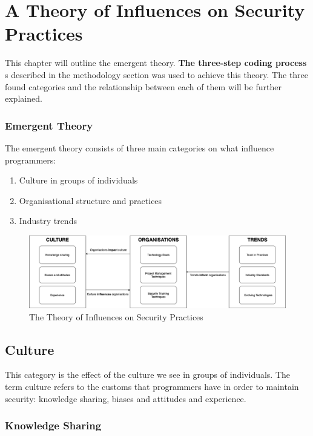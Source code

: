 \chapter{A Theory of Influences on Security Practices}\label{C:Emergent Theory}

This chapter will outline the emergent theory. \textbf{The three-step coding process }s described in the methodology section was used to achieve this theory. The three found categories and the relationship between each of them will be further explained.

\subsection{Emergent Theory}

The emergent theory consists of three main categories on what influence programmers:

\begin{enumerate}
\item  Culture in groups of individuals
\item Organisational structure and practices
\item Industry trends
\end{enumerate}

\begin{figure}[ht]
\includegraphics[width=17cm]{figures/fig2.png}
\centering
\caption{The Theory of Influences on Security Practices}
\centering
\end{figure}

\section{Culture}

This category is the effect of the culture we see in groups of individuals. The term culture refers to the customs that programmers have in order to maintain security: knowledge sharing, biases and attitudes and experience. 

\subsection{Knowledge Sharing}

